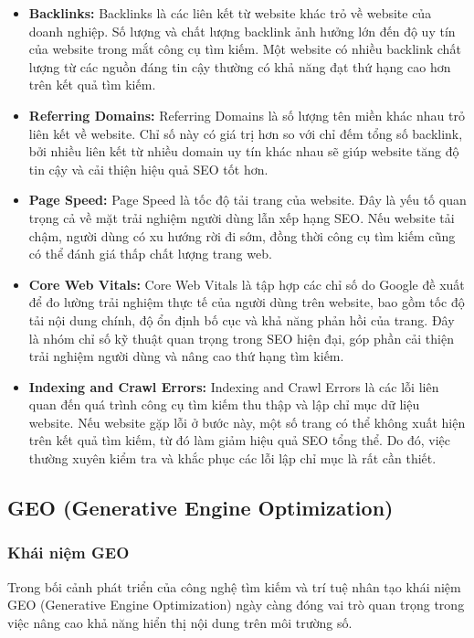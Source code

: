 \documentclass[13pt]{article}
\begin{document}
\begin{itemize}
\item \textbf{Backlinks: }
Backlinks là các liên kết từ website khác trỏ về website của doanh nghiệp. Số lượng và chất lượng backlink ảnh hưởng lớn đến độ uy tín của website trong mắt công cụ tìm kiếm. Một website có nhiều backlink chất lượng từ các nguồn đáng tin cậy thường có khả năng đạt thứ hạng cao hơn trên kết quả tìm kiếm.

\item \textbf{Referring Domains: }
Referring Domains là số lượng tên miền khác nhau trỏ liên kết về website. Chỉ số này có giá trị hơn so với chỉ đếm tổng số backlink, bởi nhiều liên kết từ nhiều domain uy tín khác nhau sẽ giúp website tăng độ tin cậy và cải thiện hiệu quả SEO tốt hơn.

\item \textbf{Page Speed: }
Page Speed là tốc độ tải trang của website. Đây là yếu tố quan trọng cả về mặt trải nghiệm người dùng lẫn xếp hạng SEO. Nếu website tải chậm, người dùng có xu hướng rời đi sớm, đồng thời công cụ tìm kiếm cũng có thể đánh giá thấp chất lượng trang web.

\item \textbf{Core Web Vitals: }
Core Web Vitals là tập hợp các chỉ số do Google đề xuất để đo lường trải nghiệm thực tế của người dùng trên website, bao gồm tốc độ tải nội dung chính, độ ổn định bố cục và khả năng phản hồi của trang. Đây là nhóm chỉ số kỹ thuật quan trọng trong SEO hiện đại, góp phần cải thiện trải nghiệm người dùng và nâng cao thứ hạng tìm kiếm.

\item \textbf{Indexing and Crawl Errors: }
Indexing and Crawl Errors là các lỗi liên quan đến quá trình công cụ tìm kiếm thu thập và lập chỉ mục dữ liệu website. Nếu website gặp lỗi ở bước này, một số trang có thể không xuất hiện trên kết quả tìm kiếm, từ đó làm giảm hiệu quả SEO tổng thể. Do đó, việc thường xuyên kiểm tra và khắc phục các lỗi lập chỉ mục là rất cần thiết.
\end{itemize}

\subsection{GEO (Generative Engine Optimization)}
\subsubsection{Khái niệm GEO}

Trong bối cảnh phát triển của công nghệ tìm kiếm và trí tuệ nhân tạo khái niệm  GEO (Generative Engine Optimization) ngày càng đóng vai trò quan trọng trong việc nâng cao khả năng hiển thị nội dung trên môi trường số.
\end{document}
